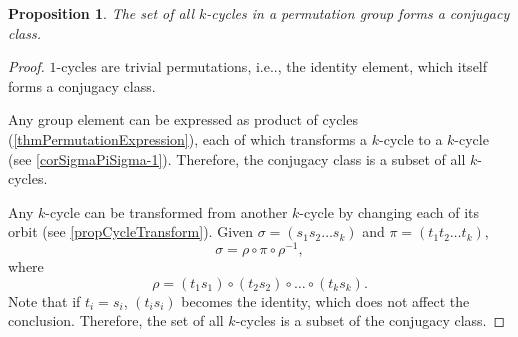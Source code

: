 \documentclass[12pt, letterpaper]{article}
\makeatletter
\newcommand\ie{i.e\@ifnextchar.{}{.\@}}
\newtheorem{prop}{Proposition}[section]
\theoremstyle{definition}
\theoremstyle{remark}
\theoremstyle{definition}
\theoremstyle{plain}
\numberwithin{equation}{section}
\makeatother
\begin{document}
	
	\begin{center}
	\end{center}
	\begin{prop}
		The set of all $k$-cycles in a permutation group forms a conjugacy class.
	\end{prop}
	\begin{proof}
		$1$-cycles are trivial permutations, \ie, the identity element,
		which itself forms a conjugacy class.
		
		Any group element can be expressed as product of cycles (\ref{thmPermutationExpression}),
		each of which transforms a $k$-cycle to a $k$-cycle (see \ref{corSigmaPiSigma-1}).
		Therefore, the conjugacy class is a subset of all $k$-cycles.
		
		Any $k$-cycle can be transformed from another $k$-cycle by changing
		each of its orbit (see \ref{propCycleTransform}).
		Given $\sigma=(s_1s_2\dots s_k)$ and $\pi=(t_1t_2\dots t_k)$,
		\[\sigma=\rho\circ\pi\circ\rho^{-1},\]
		where
		\[\rho=(t_1s_1)\circ(t_2s_2)\circ\dots\circ(t_ks_k).\]
		Note that if $t_i=s_i$, $(t_is_i)$ becomes the identity, which does not affect the conclusion.
		Therefore, the set of all $k$-cycles is a subset of the conjugacy class.
	\end{proof}
\end{document}
